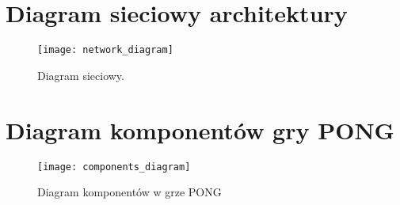 \begin{appendices}

\newpage
\section{Diagram sieciowy architektury}
\label{app:network_diagram_app}
\begin{figure}[H]
\begin{center}
    \texttt{[image: network\_diagram]}
\end{center}
\caption{Diagram sieciowy.}
\label{fig:network_diagram1}
\end{figure}



\newpage
\section{Diagram komponentów gry PONG}
\label{app:netwo}
\begin{figure}[H]
\begin{center}
    \texttt{[image: components\_diagram]}
\end{center}
\caption{Diagram komponentów w grze PONG}
\label{fig:network_diagram}
\end{figure}

\newpage

\end{appendices}
